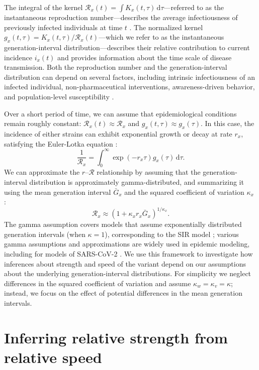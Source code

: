 \documentclass[12pt]{article}
\newcommand{\RR}{\ensuremath{{\mathcal R}}\xspace}
\newcommand{\dd}[1]{\ensuremath{\, \mathrm{d}#1}}
\newcommand{\dtau}{\dd{\tau}}
\begin{document}
The integral of the kernel $\RR_x(t) = \int K_x(t, \tau) \dtau$---referred to as the instantaneous reproduction number---describes the average infectiousness of previously infected individuals at time $t$ \citep{fraser2007estimating}.
The normalized kernel $g_x(t, \tau) = K_x(t, \tau)/\RR_x(t)$---which we refer to as the instantaneous generation-interval distribution---describes their relative contribution to current incidence $i_x(t)$ and provides information about the time scale of disease transmission.
Both the reproduction number and the generation-interval distribution can depend on several factors, including intrinsic infectiousness of an infected individual, non-pharmaceutical interventions, awareness-driven behavior, and population-level susceptibility \citep{fraser2007estimating}.

Over a short period of time, we can assume that epidemiological conditions remain roughly constant: $\RR_x(t) \approx \RR_x$ and $g_x(t, \tau) \approx g_x(\tau)$.
In this case, the incidence of either strains can exhibit exponential growth or decay at rate $r_x$, satisfying the Euler-Lotka equation \citep{wallinga2007generation}:
\begin{equation}
\frac{1}{\RR_x} = \int_0^\infty \exp(- r_x \tau) g_x(\tau) \dtau.
\end{equation}
We can approximate the $r$--$\RR$ relationship by assuming that the generation-interval distribution is approximately gamma-distributed, and summarizing it using the mean generation interval $\bar{G}_x$ and the squared coefficient of variation $\kappa_x$ \citep{park2019practical}:
\begin{equation}
\RR_x \approx (1 + \kappa_x r_x \bar{G}_x)^{1/\kappa_x}.
\end{equation}
The gamma assumption covers models that assume exponentially distributed generation intervals (when $\kappa=1$), corresponding to the SIR model \citep{anderson1991infectious}; various gamma assumptions and approximations are widely used in epidemic modeling, including for models of SARS-CoV-2 \citep{doi:10.1098/rsif.2020.0144}.
We use this framework to investigate how inferences about strength and speed of the variant depend on our assumptions about the underlying generation-interval distributions.
For simplicity we neglect differences in the squared coefficient of variation and assume $\kappa_w = \kappa_v = \kappa$; instead, we focus on the effect of potential differences in the mean generation intervals.

\section{Inferring relative strength from relative speed}
\end{document}

